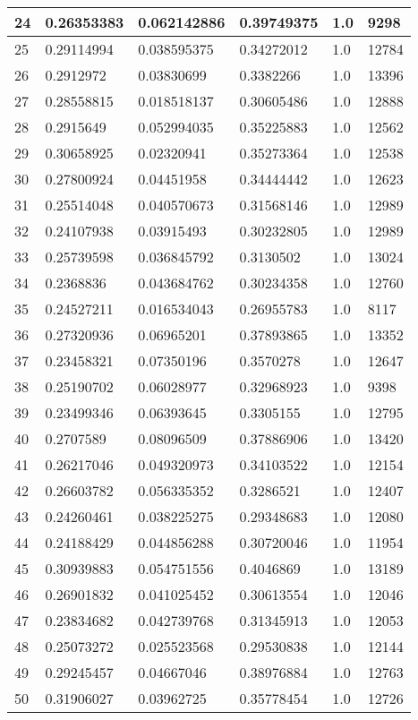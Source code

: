 \begin{longtable}{|l|l|l|l|l|l|}
24 & 0.26353383 & 0.062142886 & 0.39749375 & 1.0 & 9298 \\ \hline 
25 & 0.29114994 & 0.038595375 & 0.34272012 & 1.0 & 12784 \\ \hline 
26 & 0.2912972 & 0.03830699 & 0.3382266 & 1.0 & 13396 \\ \hline 
27 & 0.28558815 & 0.018518137 & 0.30605486 & 1.0 & 12888 \\ \hline 
28 & 0.2915649 & 0.052994035 & 0.35225883 & 1.0 & 12562 \\ \hline 
29 & 0.30658925 & 0.02320941 & 0.35273364 & 1.0 & 12538 \\ \hline 
30 & 0.27800924 & 0.04451958 & 0.34444442 & 1.0 & 12623 \\ \hline 
31 & 0.25514048 & 0.040570673 & 0.31568146 & 1.0 & 12989 \\ \hline 
32 & 0.24107938 & 0.03915493 & 0.30232805 & 1.0 & 12989 \\ \hline 
33 & 0.25739598 & 0.036845792 & 0.3130502 & 1.0 & 13024 \\ \hline 
34 & 0.2368836 & 0.043684762 & 0.30234358 & 1.0 & 12760 \\ \hline 
35 & 0.24527211 & 0.016534043 & 0.26955783 & 1.0 & 8117 \\ \hline 
36 & 0.27320936 & 0.06965201 & 0.37893865 & 1.0 & 13352 \\ \hline 
37 & 0.23458321 & 0.07350196 & 0.3570278 & 1.0 & 12647 \\ \hline 
38 & 0.25190702 & 0.06028977 & 0.32968923 & 1.0 & 9398 \\ \hline 
39 & 0.23499346 & 0.06393645 & 0.3305155 & 1.0 & 12795 \\ \hline 
40 & 0.2707589 & 0.08096509 & 0.37886906 & 1.0 & 13420 \\ \hline 
41 & 0.26217046 & 0.049320973 & 0.34103522 & 1.0 & 12154 \\ \hline 
42 & 0.26603782 & 0.056335352 & 0.3286521 & 1.0 & 12407 \\ \hline 
43 & 0.24260461 & 0.038225275 & 0.29348683 & 1.0 & 12080 \\ \hline 
44 & 0.24188429 & 0.044856288 & 0.30720046 & 1.0 & 11954 \\ \hline 
45 & 0.30939883 & 0.054751556 & 0.4046869 & 1.0 & 13189 \\ \hline 
46 & 0.26901832 & 0.041025452 & 0.30613554 & 1.0 & 12046 \\ \hline 
47 & 0.23834682 & 0.042739768 & 0.31345913 & 1.0 & 12053 \\ \hline 
48 & 0.25073272 & 0.025523568 & 0.29530838 & 1.0 & 12144 \\ \hline 
49 & 0.29245457 & 0.04667046 & 0.38976884 & 1.0 & 12763 \\ \hline 
50 & 0.31906027 & 0.03962725 & 0.35778454 & 1.0 & 12726 \\ \hline 
\end{longtable}